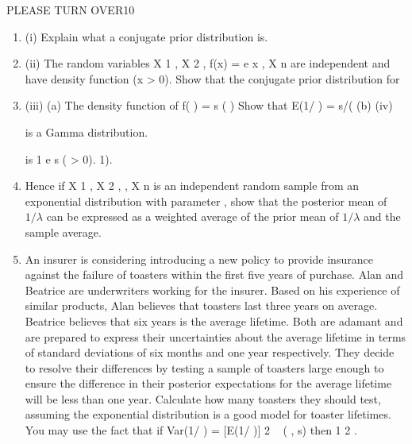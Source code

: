 \documentclass[a4paper,12pt]{article}
\begin{document}

PLEASE TURN OVER10
\begin{enumerate}
\item (i) Explain what a conjugate prior distribution is.
\item (ii) The random variables X 1 , X 2 ,
f(x) = e
x
, X n are independent and have density function
(x > 0).
Show that the conjugate prior distribution for
\item (iii)
(a)
The density function of
f( ) =
s
( )
Show that E(1/ ) = s/(
(b)
(iv)

is a Gamma distribution.

is
1
e
s
( > 0).
1).
\item Hence if X 1 , X 2 , , X n is an independent random sample from an exponential distribution with parameter , show that the posterior
mean of $1/\lambda$ can be expressed as a weighted average of the prior mean of $1/\lambda$ and the sample average.

\item 
An insurer is considering introducing a new policy to provide insurance
against the failure of toasters within the first five years of purchase. Alan and Beatrice are underwriters working for the insurer. Based on his experience of
similar products, Alan believes that toasters last three years on average. Beatrice believes that six years is the average lifetime. Both are adamant and
are prepared to express their uncertainties about the average lifetime in terms of standard deviations of six months and one year respectively. They decide
to resolve their differences by testing a sample of toasters large enough to ensure the difference in their posterior expectations for the average lifetime
will be less than one year.
Calculate how many toasters they should test, assuming the exponential distribution is a good model for toaster lifetimes.
You may use the fact that if
Var(1/ ) = [E(1/ )] 2
~ ( , s) then
1
2
.
\end{enumerate}
\newpage 
\end{document}
